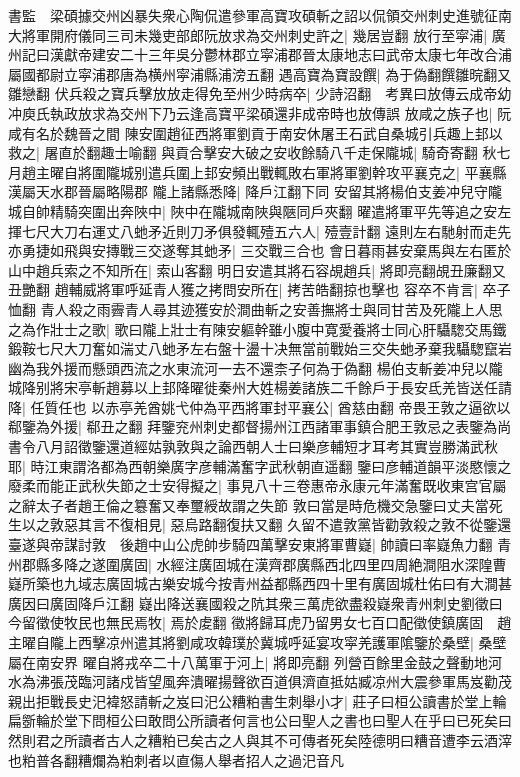 書監　梁碩據交州凶暴失衆心陶侃遣參軍高寶攻碩斬之詔以侃領交州刺史進號征南大將軍開府儀同三司未幾吏部郎阮放求為交州刺史許之|{
	幾居豈翻}
放行至寜浦|{
	廣州記曰漢獻帝建安二十三年吳分鬱林郡立寜浦郡晉太康地志曰武帝太康七年改合浦屬國都尉立寜浦郡唐為横州寜浦縣浦滂五翻}
遇高寶為寶設饌|{
	為于偽翻饌雛晥翻又雛戀翻}
伏兵殺之寶兵擊放放走得免至州少時病卒|{
	少詩沼翻　考異曰放傳云成帝幼冲庾氏執政放求為交州下乃云逢高寶平梁碩還非成帝時也放傳誤}
放咸之族子也|{
	阮咸有名於魏晉之間}
陳安圍趙征西將軍劉貢于南安休屠王石武自桑城引兵趣上邽以救之|{
	屠直於翻趣士喻翻}
與貢合擊安大破之安收餘騎八千走保隴城|{
	騎奇寄翻}
秋七月趙主曜自將圍隴城别遣兵圍上邽安頻出戰輒敗右軍將軍劉幹攻平襄克之|{
	平襄縣漢屬天水郡晉屬略陽郡}
隴上諸縣悉降|{
	降戶江翻下同}
安留其將楊伯支姜冲兒守隴城自帥精騎突圍出奔陜中|{
	陜中在隴城南陜與陿同戶夾翻}
曜遣將軍平先等追之安左揮七尺大刀右運丈八虵矛近則刀矛俱發輒殪五六人|{
	殪壹計翻}
遠則左右馳射而走先亦勇捷如飛與安摶戰三交遂奪其虵矛|{
	三交戰三合也}
會日暮雨甚安棄馬與左右匿於山中趙兵索之不知所在|{
	索山客翻}
明日安遣其將石容覘趙兵|{
	將即亮翻覘丑廉翻又丑艷翻}
趙輔威將軍呼延青人獲之拷問安所在|{
	拷苦皓翻掠也擊也}
容卒不肯言|{
	卒子恤翻}
青人殺之雨霽青人尋其迹獲安於澗曲斬之安善撫將士與同甘苦及死隴上人思之為作壯士之歌|{
	歌曰隴上壯士有陳安軀幹雖小腹中寛愛養將士同心肝䯀騘交馬鐵鍛鞍七尺大刀奮如湍丈八虵矛左右盤十盪十决無當前戰始三交失虵矛棄我䯀騘竄岩幽為我外援而懸頭西流之水東流河一去不還柰子何為于偽翻}
楊伯支斬姜冲兒以隴城降别將宋亭斬趙募以上邽降曜徙秦州大姓楊姜諸族二千餘戶于長安氐羌皆送任請降|{
	任質任也}
以赤亭羌酋姚弋仲為平西將軍封平襄公|{
	酋慈由翻}
帝畏王敦之逼欲以郗鑒為外援|{
	郗丑之翻}
拜鑒兖州刺史都督揚州江西諸軍事鎮合肥王敦忌之表鑒為尚書令八月詔徵鑒還道經姑孰敦與之論西朝人士曰樂彦輔短才耳考其實豈勝滿武秋耶|{
	時江東謂洛都為西朝樂廣字彦輔滿奮字武秋朝直遥翻}
鑒曰彦輔道韻平淡愍懷之廢柔而能正武秋失節之士安得擬之|{
	事見八十三卷惠帝永康元年滿奮既收東宫官屬之辭太子者趙王倫之簒奮又奉璽綬故謂之失節}
敦曰當是時危機交急鑒曰丈夫當死生以之敦惡其言不復相見|{
	惡烏路翻復扶又翻}
久留不遣敦黨皆勸敦殺之敦不從鑒還臺遂與帝謀討敦　後趙中山公虎帥步騎四萬擊安東將軍曹嶷|{
	帥讀曰率嶷魚力翻}
青州郡縣多降之遂圍廣固|{
	水經注廣固城在漢齊郡廣縣西北四里四周絶澗阻水深隍曹嶷所築也九域志廣固城古樂安城今按青州益都縣西四十里有廣固城杜佑曰有大澗甚廣因曰廣固降戶江翻}
嶷出降送襄國殺之阬其衆三萬虎欲盡殺嶷衆青州刺史劉徵曰今留徵使牧民也無民焉牧|{
	焉於䖍翻}
徵將歸耳虎乃留男女七百口配徵使鎮廣固　趙主曜自隴上西擊凉州遣其將劉咸攻韓璞於冀城呼延宴攻寜羌護軍隂鑒於桑壁|{
	桑壁屬在南安界}
曜自將戎卒二十八萬軍于河上|{
	將即亮翻}
列營百餘里金鼓之聲動地河水為沸張茂臨河諸戍皆望風奔潰曜揚聲欲百道俱濟直抵姑臧凉州大震參軍馬岌勸茂親出拒戰長史汜褘怒請斬之岌曰汜公糟粕書生刺舉小才|{
	莊子曰桓公讀書於堂上輪扁斵輪於堂下問桓公曰敢問公所讀者何言也公曰聖人之書也曰聖人在乎曰已死矣曰然則君之所讀者古人之糟粕已矣古之人與其不可傳者死矣陸德明曰糟音遭李云酒滓也粕普各翻糟爛為粕刺者以直傷人舉者招人之過汜音凡}

